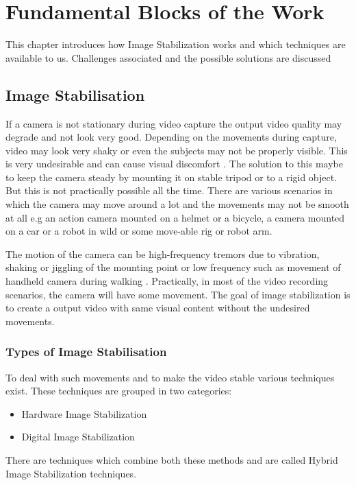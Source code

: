 \chapter{Fundamental Blocks of the Work} \label{chapter_two}

This chapter introduces how Image Stabilization works and which techniques are available to us. Challenges associated and the possible solutions are discussed 

\section{Image Stabilisation}
\label{sec:image_stab}
If a camera is not stationary during video capture the output video quality may degrade and not look very good. Depending on the movements during capture, video may look very shaky or even the subjects may not be properly visible. This is very undesirable and can cause visual discomfort \citep{jia2012probabilistic}. The solution to this maybe to keep the camera steady by mounting it on stable tripod or to a rigid object. But this is not practically possible all the time. There are various scenarios in which the camera may move around a lot and the movements may not be smooth at all e.g an action camera mounted on a helmet or a bicycle, a camera mounted on a car or a robot in wild or some move-able rig or robot arm.

The motion of the camera can be high-frequency tremors due to vibration, shaking or jiggling of the mounting point \citep{ryu2012robust} or low frequency such as movement of handheld camera during walking \citep{dis_review}. Practically, in most of the video recording scenarios, the camera will have some movement. The goal of image stabilization is to create a output video with same visual content without the undesired movements. 

\subsection{Types of Image Stabilisation}
To deal with such movements and to make the video stable various techniques exist. These techniques are grouped in two categories:

\begin{itemize}
\item Hardware Image Stabilization
\item Digital Image Stabilization  
\end{itemize}
There are techniques which combine both these methods and are called Hybrid Image Stabilization techniques.

